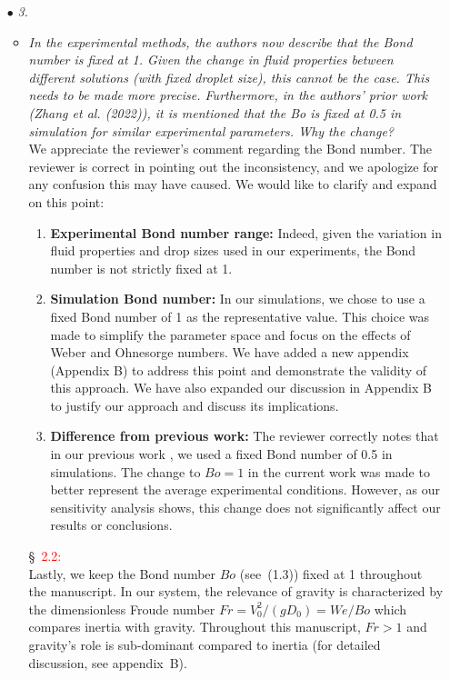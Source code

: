 \documentclass[]{article}
\newcommand*\red{\textcolor{red}}
\newcommand{\oo}{\color{magenta} \normalfont}
\newcommand{\bb}{\color{black} \normalfont}
\begin{document}
\begin{enumerate}
	\item[$\bullet$] \textit{3.}
	\begin{itemize}
		\renewcommand\labelitemi{--}
		\item \textit{In the experimental methods, the authors now describe that the Bond number is fixed at 1. Given the change in fluid properties between different solutions (with fixed droplet size), this cannot be the case. This needs to be made more precise. Furthermore, in the authors' prior work (Zhang et al. (2022)), it is mentioned that the Bo is fixed at 0.5 in simulation for similar experimental parameters. Why the change?}\\[1mm]
		
		We appreciate the reviewer's comment regarding the Bond number. 
		The reviewer is correct in pointing out the inconsistency, and we apologize for any confusion this may have caused. We would like to clarify and expand on this point:

		\begin{enumerate}
			\item \textbf{Experimental Bond number range:}
			Indeed, given the variation in fluid properties and drop sizes used in our experiments, the Bond number is not strictly fixed at 1. 
			\item \textbf{Simulation Bond number:}
			In our simulations, we chose to use a fixed Bond number of 1 as the representative value. This choice was made to simplify the parameter space and focus on the effects of Weber and Ohnesorge numbers. We have added a new appendix (Appendix B) to address this point and demonstrate the validity of this approach. We have also expanded our discussion in Appendix B to justify our approach and discuss its implications.
			\item \textbf{Difference from previous work:}
			The reviewer correctly notes that in our previous work \citep{zhang2022impact}, we used a fixed Bond number of 0.5 in simulations. The change to $Bo = 1$ in the current work was made to better represent the average experimental conditions. However, as our sensitivity analysis shows, this change does not significantly affect our results or conclusions.
		\end{enumerate}		
		
		\S~\red{2.2:}\\
		\oo
		Lastly, we keep the Bond number $Bo$ (see~(1.3)) fixed at 1 throughout the manuscript. In our system, the relevance of gravity is characterized by the dimensionless Froude number $Fr = V_0^2/(gD_0) = We/Bo$ which compares inertia with gravity. Throughout this manuscript, $Fr > 1$ and gravity's role is sub-dominant compared to inertia (for detailed discussion, see appendix~B).
		\bb
		

\end{itemize}
\end{enumerate}
\end{document}
